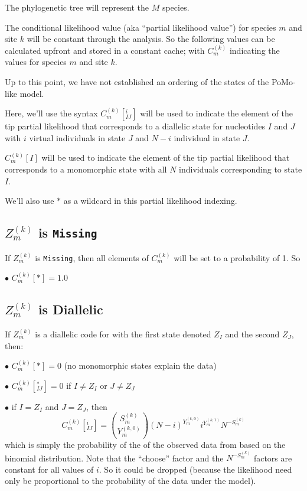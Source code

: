 \documentclass{llncs}
\newcommand{\virtPopSize}{\ensuremath{N}}
\newcommand{\pomo}{PoMo\xspace}
\begin{document}
The phylogenetic tree will represent the $M$ species.

The conditional likelihood value (aka ``partial likelihood value'') for species $m$ and site $k$ will be constant through the analysis.
So the following values can be calculated upfront and stored in a constant cache;
with $C_m^{(k)}$ indicating the values for species $m$ and site $k$.

Up to this point, we have not established an ordering of the states of the \pomo-like model.

Here, we'll use the syntax $C_m^{(k)}[^{i}_{IJ}]$ will be used to indicate the element of 
    the tip partial likelihood that corresponds to a diallelic state for nucleotides $I$ and $J$
    with $i$ virtual individuals in state $J$ and $N-i$ individual in state $J$.

$C_m^{(k)}[I]$ will be used to indicate the element of 
    the tip partial likelihood that corresponds to a monomorphic state with all $\virtPopSize$
    individuals corresponding to state $I$.

We'll also use $\ast$ as a wildcard in this partial likelihood indexing.

\subsection*{$Z_m^{(k)}$ is \texttt{Missing}}
If $Z_m^{(k)}$ is \texttt{Missing}, then all elements of $C_m^{(k)}$ will be set to a probability of 1. So
\begin{compactitem}
    \item[$\bullet$] $C_m^{(k)}[\ast]=1.0$
\end{compactitem}

\subsection*{$Z_m^{(k)}$ is Diallelic}
If $Z_m^{(k)}$ is a diallelic code for with the first state denoted $Z_I$ and the second $Z_J$, then:
\begin{compactitem}
    \item[$\bullet$] $C_m^{(k)}[*] = 0$  (no monomorphic states explain the data)
    \item[$\bullet$] $C_m^{(k)}[^{\ast}_{IJ}] = 0$  if $I\neq Z_I$ or $J\neq Z_J$
    \item[$\bullet$] if $I = Z_I$ and $J = Z_J$, then
     $$C_m^{(k)}[^{i}_{IJ}] = {S_m^{(k)} \choose Y_m^{(k,0)}} (\virtPopSize - i)^{Y_m^{(k,0)}}i^{Y_m^{(k,1)}} \virtPopSize^{-S_m^{(k)}}$$
     which is simply the probability of the of the observed data from based on the binomial distribution.
     Note that the ``choose'' factor and the $ \virtPopSize^{-S_m^{(k)}}$ factors are constant for all values of $i$. So it could be dropped (because the likelihood need only be proportional to the probability of the data under the model).
\end{compactitem}
\end{document}
